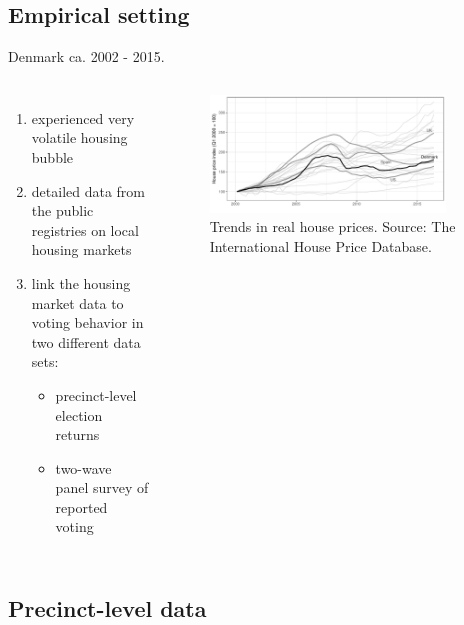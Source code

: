 \documentclass[10pt,aspectratio=169,handout]{beamer}
\begin{document}
\subsection{Empirical setting}
\begin{frame}
Denmark ca. 2002 - 2015.\pause

\begin{columns}


\begin{enumerate}[<+->]
	\item experienced very volatile housing bubble
	\item detailed data from the public registries on local housing markets 
	\item link the housing market data to voting behavior in two different data sets:
	\begin{itemize}[<+->]
		\item precinct-level election returns
		\item two-wave panel survey of reported voting
	\end{itemize}
\end{enumerate}


	\begin{figure}[htbp!]
	\includegraphics[width=0.9\textwidth]{../../figures/timeplot}
	\centering
	\caption{Trends in real house prices. Source: The International House Price Database.}\label{hpd}
\end{figure}

\end{columns}


\end{frame}

\subsection{Precinct-level data}
\end{document}
